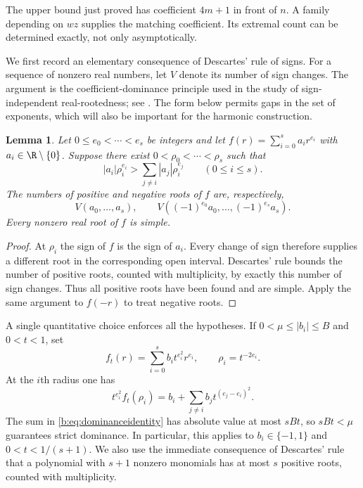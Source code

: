 \documentclass[UTF8,11pt]{ctexart}
\newtheorem{lem}[thm]{Lemma}
\theoremstyle{definition}
\numberwithin{equation}{section}
\begin{document}
The upper bound just proved has coefficient $4m+1$ in front of $n$.
A family depending on $wz$ supplies the matching coefficient. Its
extremal count can be determined exactly, not only asymptotically.

We first record an elementary consequence of Descartes' rule of
signs. For a sequence of nonzero real numbers, let $V$ denote its
number of sign changes. The argument is the coefficient-dominance
principle used in the study of sign-independent real-rootedness; see
\cite[Proposition~1 and its proof, \av, pp.~2, 9--10]{FNS17}.
The form below permits gaps in the set of exponents, which will also
be important for the harmonic construction.
\begin{lem}\label{b:lem:dominance}
Let $0\le e_0<\cdots<e_s$ be integers and let
$f(r)=\sum_{i=0}^s a_ir^{e_i}$ with $a_i\in\R\setminus\{0\}$.
Suppose there exist $0<\rho_0<\cdots<\rho_s$ such that
\[
 |a_i|\rho_i^{e_i}>
 \sum_{j\ne i}|a_j|\rho_i^{e_j}\qquad(0\le i\le s).
\]
The numbers of positive and negative roots of $f$ are, respectively,
\[
 V(a_0,\ldots,a_s),\qquad
 V((-1)^{e_0}a_0,\ldots,(-1)^{e_s}a_s).
\]
Every nonzero real root of $f$ is simple.
\end{lem}
\begin{proof}
At $\rho_i$ the sign of $f$ is the sign of $a_i$. Every change of
sign therefore supplies a different root in the corresponding open
interval. Descartes' rule bounds the number of positive roots,
counted with multiplicity, by exactly this number of sign changes.
Thus all positive roots have been found and are simple. Apply the
same argument to $f(-r)$ to treat negative roots.
\end{proof}

A single quantitative choice enforces all the hypotheses. If
$0<\mu\le|b_i|\le B$ and $0<t<1$, set
\[
 f_t(r)=\sum_{i=0}^s b_it^{e_i^2}r^{e_i},\qquad
 \rho_i=t^{-2e_i}.
\]
At the $i$th radius one has
\begin{equation}\label{b:eq:dominanceidentity}
 t^{e_i^2}f_t(\rho_i)
 =b_i+\sum_{j\ne i}b_jt^{(e_j-e_i)^2}.
\end{equation}
The sum in \eqref{b:eq:dominanceidentity} has absolute value at most
$sBt$, so $sBt<\mu$ guarantees strict dominance. In particular, this
applies to $b_i\in\{-1,1\}$ and $0<t<1/(s+1)$.
We also use the immediate consequence of Descartes' rule that a
polynomial with $s+1$ nonzero monomials has at most $s$ positive
roots, counted with multiplicity.
\end{document}
